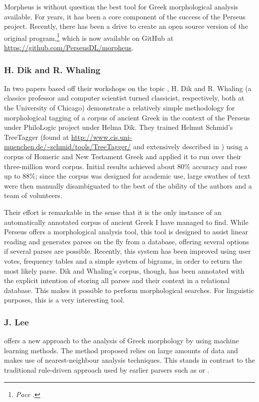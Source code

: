 Morpheus is without question the best tool for Greek morphological
analysis available. For years, it has been a core component of the
success of the Perseus project. Recently, there has been a drive to
create an open source version of the original
program,\footnote{\textit{Pace} \cite{blackwell2009}.} which is now
available on GitHub at \url{https://github.com/PerseusDL/morpheus}. 

\subsubsection{H. Dik and R. Whaling}
\label{sec:dikwhaling}
In two papers based off their workshops on the topic
\citep{dik2008,dik2009}, H. Dik and R. Whaling (a classics professor
and computer scientist turned classicist, respectively, both at the
University of Chicago) demonstrate a relatively simple methodology for
morphological tagging of a corpus of ancient Greek in the context of
the Perseus under PhiloLogic project under Helma Dik.  They trained
Helmut Schmid's TreeTagger (found at
\url{http://www.cis.uni-muenchen.de/~schmid/tools/TreeTagger/} and
extensively described in \cite{schmid1994,schmid1995}) using a corpus
of Homeric and New Testament Greek and applied it to run over their
three-million word corpus. Initial results achieved about 80\%
accuracy and rose up to 88\%; since the corpus was designed for
academic use, large swathes of text were then manually disambiguated
to the best of the ability of the authors and a team of volunteers.

Their effort is remarkable in the sense that it is the only instance
of an automatically annotated corpus of ancient Greek I have managed
to find. While Perseus offers a morphological analysis tool, this tool
is designed to assist linear reading and generates parses on the fly
from a database, offering several options if several parses are
possible. Recently, this system has been improved using user votes,
frequency tables and a simple system of bigrams, in order to return
the most likely parse. Dik and Whaling's corpus, though, has been
annotated with the explicit intention of storing all parses and their
context in a relational database. This makes it possible to perform
morphological searches. For linguistic purposes, this is a very
interesting tool.

\subsubsection{J. Lee}
\cite{lee2008nearest} offers a new approach to the analysis of Greek
morphology by using machine learning methods. The method proposed
relies on large amounts of data and makes use of nearest-neighbour
analysis techniques. This stands in contrast to the traditional
rule-driven approach used by earlier parsers such as
\cite{packard1973computer} or \cite{crane1991generating}. 

